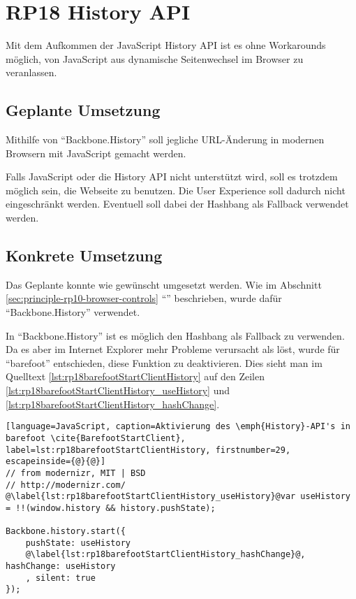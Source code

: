 \section{RP18 History API}
\label{sec:principle-rp18-history-api}

Mit dem Aufkommen der JavaScript History API \cite{HistoryAPI} ist es ohne Workarounds möglich, von JavaScript aus dynamische Seitenwechsel im Browser zu veranlassen.

\subsection*{Geplante Umsetzung}
Mithilfe von ``Backbone.History'' \cite{BackbonejsHistory} soll jegliche \gls{URL}-Änderung in modernen Browsern mit JavaScript gemacht werden.

Falls JavaScript oder die History API nicht unterstützt wird, soll es trotzdem möglich sein, die Webseite zu benutzen. Die User Experience soll dadurch nicht eingeschränkt werden. Eventuell soll dabei der \gls{Hashbang} als Fallback verwendet werden.

\subsection*{Konkrete Umsetzung}
Das Geplante konnte wie gewünscht umgesetzt werden. Wie im Abschnitt \ref{sec:principle-rp10-browser-controls} ``'' beschrieben, wurde dafür ``Backbone.History'' verwendet.

In ``Backbone.History'' ist es möglich den Hashbang als Fallback zu verwenden. Da es aber im Internet Explorer mehr Probleme verursacht als löst, wurde für ``barefoot'' entschieden, diese Funktion zu deaktivieren. Dies sieht man im Quelltext \ref{lst:rp18barefootStartClientHistory} auf den Zeilen \ref{lst:rp18barefootStartClientHistory_useHistory} und \ref{lst:rp18barefootStartClientHistory_hashChange}.

\begin{lstlisting}[language=JavaScript, caption=Aktivierung des \emph{History}-API's in barefoot \cite{BarefootStartClient}, label=lst:rp18barefootStartClientHistory, firstnumber=29, escapeinside={@}{@}]
// from modernizr, MIT | BSD
// http://modernizr.com/
@\label{lst:rp18barefootStartClientHistory_useHistory}@var useHistory = !!(window.history && history.pushState);

Backbone.history.start({
	pushState: useHistory
	@\label{lst:rp18barefootStartClientHistory_hashChange}@, hashChange: useHistory
	, silent: true
});
\end{lstlisting}

